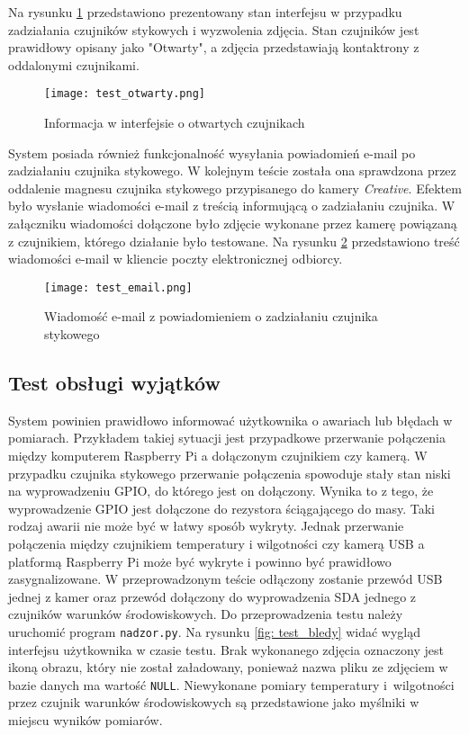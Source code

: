 \documentclass[a4paper,11pt,twoside]{article}
\begin{document}
Na rysunku \ref{fig: test_otwarty} przedstawiono prezentowany stan interfejsu w przypadku zadziałania czujników stykowych i wyzwolenia zdjęcia. Stan czujników jest prawidłowy opisany jako "Otwarty", a zdjęcia przedstawiają kontaktrony z oddalonymi czujnikami.
\begin{figure}[H]
\begin{center}
\texttt{[image: test\_otwarty.png]}
\caption{Informacja w interfejsie o otwartych czujnikach}
\label{fig: test_otwarty}
\end{center}
\end{figure}

System posiada również funkcjonalność wysyłania powiadomień e-mail po zadziałaniu czujnika stykowego. W kolejnym teście została ona sprawdzona przez oddalenie magnesu czujnika stykowego przypisanego do kamery \textit{Creative}. Efektem było wysłanie wiadomości e-mail z treścią informującą o zadziałaniu czujnika. W załączniku wiadomości dołączone było zdjęcie wykonane przez kamerę powiązaną z czujnikiem, którego działanie było testowane. Na rysunku \ref{fig: test_email} przedstawiono treść wiadomości e-mail w kliencie poczty elektronicznej odbiorcy.
\begin{figure}[H]
\begin{center}
\texttt{[image: test\_email.png]}
\caption{Wiadomość e-mail z powiadomieniem o zadziałaniu czujnika stykowego}
\label{fig: test_email}
\end{center}
\end{figure}

\subsection{Test obsługi wyjątków}
System powinien prawidłowo informować użytkownika o awariach lub błędach w pomiarach. Przykładem takiej sytuacji jest przypadkowe przerwanie połączenia między komputerem Raspberry Pi a dołączonym czujnikiem czy kamerą. W przypadku czujnika stykowego przerwanie połączenia spowoduje stały stan niski na wyprowadzeniu GPIO, do którego jest on dołączony. Wynika to z tego, że wyprowadzenie GPIO jest dołączone do rezystora ściągającego do masy. Taki rodzaj awarii nie może być w łatwy sposób wykryty. Jednak przerwanie połączenia między czujnikiem temperatury i wilgotności czy kamerą USB a platformą Raspberry Pi może być wykryte i powinno być prawidłowo zasygnalizowane. W przeprowadzonym teście odłączony zostanie przewód USB jednej z kamer oraz przewód dołączony do wyprowadzenia SDA jednego z czujników warunków środowiskowych. Do przeprowadzenia testu należy uruchomić program \texttt{nadzor.py}. Na rysunku \ref{fig: test_bledy} widać wygląd interfejsu użytkownika w czasie testu. Brak wykonanego zdjęcia oznaczony jest ikoną obrazu, który nie został załadowany, ponieważ nazwa pliku ze zdjęciem w bazie danych ma wartość \texttt{NULL}. Niewykonane pomiary temperatury i~wilgotności przez czujnik warunków środowiskowych są przedstawione jako myślniki w miejscu wyników pomiarów.
\end{document}
